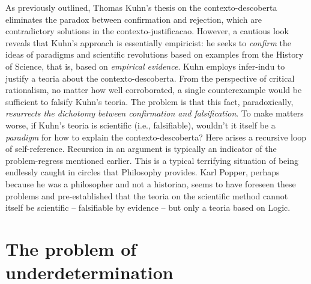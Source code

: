 \documentclass[./main_en.tex]{subfiles}
\begin{document}
\par As previously outlined, Thomas Kuhn's thesis on the \gls{contexto-descoberta} eliminates the paradox between confirmation and rejection, which are contradictory solutions in the \gls{contexto-justificacao}. However, a cautious look reveals that Kuhn's approach is essentially empiricist: he seeks to \textit{confirm} the ideas of paradigms and scientific revolutions based on examples from the History of Science, that is, based on \textit{empirical evidence}. Kuhn employs \gls{infer-indu} to justify a \gls{teoria} about the \gls{contexto-descoberta}. From the perspective of critical rationalism, no matter how well corroborated, a single counterexample would be sufficient to falsify Kuhn's \gls{teoria}. The problem is that this fact, paradoxically, \textit{resurrects the dichotomy between confirmation and falsification}. To make matters worse, if Kuhn's \gls{teoria} is scientific (i.e., falsifiable), wouldn't it itself be a \textit{paradigm} for how to explain the \gls{contexto-descoberta}? Here arises a recursive loop of self-reference. Recursion in an argument is typically an indicator of the \gls{problem-regress} mentioned earlier. This is a typical terrifying situation of being endlessly caught in circles that Philosophy provides. Karl Popper, perhaps because he was a philosopher and not a historian, seems to have foreseen these problems and pre-established that the \gls{teoria} on the scientific method cannot itself be scientific – falsifiable by evidence – but only a \gls{teoria} based on Logic.

\section{The problem of underdetermination} \label{sec:epis:under}
\end{document}
